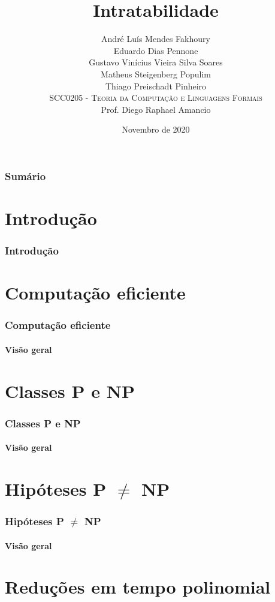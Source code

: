 \documentclass{beamer}
\title[Intratabilidade]{Intratabilidade}
\subtitle{}
\author[André, Eduardo, Gustavo, Matheus, Thiago]{
André Luís Mendes Fakhoury\\ Eduardo Dias Pennone\\ Gustavo Vinícius Vieira Silva Soares\\ Matheus Steigenberg Populim\\ Thiago Preischadt Pinheiro\\ \bigskip
\textsc{SCC0205 - Teoria da Computação e Linguagens Formais}\\
Prof. Diego Raphael Amancio
}
\institute[ICMC/USP]{ICMC - USP}
\date[2020]{\footnotesize{Novembro de 2020}}
\begin{document}
\begin{frame}[plain]
\titlepage
\end{frame}

\begin{frame}
\frametitle{Sumário}
\tableofcontents
\end{frame}

\section{Introdução} %

\begin{frame}
\frametitle{Introdução}
\end{frame}

\section{Computação eficiente} %

\begin{frame}
\frametitle{Computação eficiente}
\framesubtitle{Visão geral}
\end{frame}

\section{Classes P e NP}

\begin{frame}
\frametitle{Classes P e NP}
\framesubtitle{Visão geral}
\end{frame}

\section{Hipóteses P $\neq$ NP}

\begin{frame}
\frametitle{Hipóteses P $\neq$ NP}
\framesubtitle{Visão geral}
\end{frame}

\section{Reduções em tempo polinomial}
\end{document}
